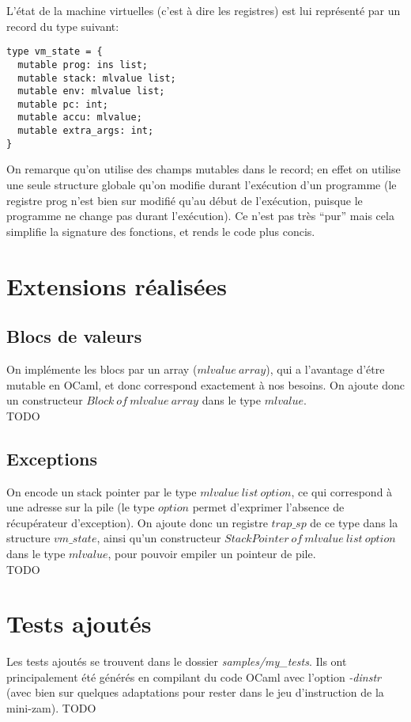 \documentclass{article}
\begin{document}
L'état de la machine virtuelles (c'est à dire les registres) est lui représenté par un record du type suivant:
\begin{lstlisting}
type vm_state = {
  mutable prog: ins list;
  mutable stack: mlvalue list;
  mutable env: mlvalue list;
  mutable pc: int;
  mutable accu: mlvalue;
  mutable extra_args: int;
}
\end{lstlisting}
On remarque qu'on utilise des champs mutables dans le record; en effet on utilise une seule structure globale qu'on modifie durant l'exécution d'un programme (le registre prog n'est bien sur modifié qu'au début de l'exécution, puisque le programme ne change pas durant l'exécution). Ce n'est pas très ``pur'' mais cela simplifie la signature des fonctions, et rends le code plus concis.

\section{Extensions réalisées}

\subsection{Blocs de valeurs}
On implémente les blocs par un array ($mlvalue\:array$), qui a l'avantage d'étre mutable en OCaml, et donc correspond exactement à nos besoins. On ajoute donc un constructeur $Block\:of\:mlvalue\:array$ dans le type $mlvalue$.\\
TODO

\subsection{Exceptions}
On encode un stack pointer par le type $mlvalue\:list\:option$, ce qui correspond à une adresse sur la pile (le type $option$ permet d'exprimer l'absence de récupérateur d'exception). On ajoute donc un registre $trap\_sp$ de ce type dans la structure $vm\_state$, ainsi qu'un constructeur $StackPointer\:of\:mlvalue\:list\:option$ dans le type $mlvalue$, pour pouvoir empiler un pointeur de pile.\\
TODO

\section{Tests ajoutés}
Les tests ajoutés se trouvent dans le dossier \textit{samples/my\_tests}. Ils ont principalement été générés en compilant du code OCaml avec l'option \textit{-dinstr} (avec bien sur quelques adaptations pour rester dans le jeu d'instruction de la mini-zam).
TODO
\end{document}
